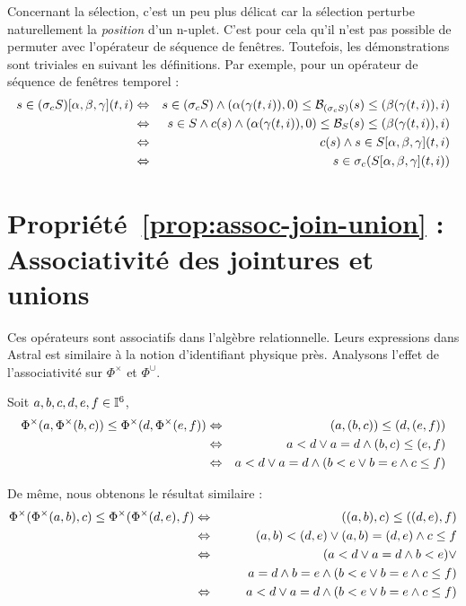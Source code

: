 Concernant la sélection, c'est un peu plus délicat car la sélection perturbe naturellement la \textit{position} d'un n-uplet. C'est pour cela qu'il n'est pas possible de permuter avec l'opérateur de séquence de fenêtres. Toutefois, les démonstrations sont triviales en suivant les définitions. Par exemple, pour un opérateur de séquence de fenêtres temporel :
\begin{eqnarray*}
s\in (\sigma_c S)[\alpha,\beta,\gamma](t,i) & \Leftrightarrow & s\in (\sigma_c S) \wedge (\alpha(\gamma(t,i)),0) \leq \mathcal{B}_{(\sigma_c S)}(s) \leq (\beta(\gamma(t,i)),i)\\
& \Leftrightarrow & s\in S \wedge c(s) \wedge (\alpha(\gamma(t,i)),0) \leq \mathcal{B}_S(s) \leq (\beta(\gamma(t,i)),i)\\
& \Leftrightarrow & c(s) \wedge s\in S[\alpha,\beta,\gamma](t,i)\\
& \Leftrightarrow & s\in \sigma_c (S[\alpha,\beta,\gamma](t,i))
\end{eqnarray*}
\findemo

\section{Propriété~\ref{prop:assoc-join-union} : Associativité des jointures et unions}
Ces opérateurs sont associatifs dans l'algèbre relationnelle. Leurs expressions dans Astral est similaire à la notion d'identifiant physique près. Analysons l'effet de l'associativité sur $\Phi^\times$ et $\Phi^\cup$.

Soit $a,b,c,d,e,f \in \mathbb{I}^6$, 
\begin{eqnarray*}
\Phi^\times(a,\Phi^\times(b,c)) \leq \Phi^\times(d,\Phi^\times(e,f))& \Leftrightarrow & (a,(b,c)) \leq (d,(e,f)) \\
& \Leftrightarrow &  a < d \vee a=d \wedge (b,c) \leq (e,f) \\
& \Leftrightarrow &  a < d \vee a=d \wedge (b < e \vee b=e \wedge c \leq f)
\end{eqnarray*}

De même, nous obtenons le résultat similaire :
\begin{eqnarray*}
\Phi^\times(\Phi^\times(a,b),c) \leq \Phi^\times(\Phi^\times(d,e),f)& \Leftrightarrow & ((a,b),c) \leq ((d,e),f) \\
& \Leftrightarrow & (a,b) < (d,e) \vee (a,b) = (d,e) \wedge c \leq f \\
& \Leftrightarrow & (a < d \vee a = d \wedge b < e) \vee \\ &  & \qquad a = d \wedge b = e \wedge (b < e \vee b=e \wedge c \leq f) \\
& \Leftrightarrow &  a < d \vee a=d \wedge (b < e \vee b=e \wedge c \leq f)
\end{eqnarray*}

